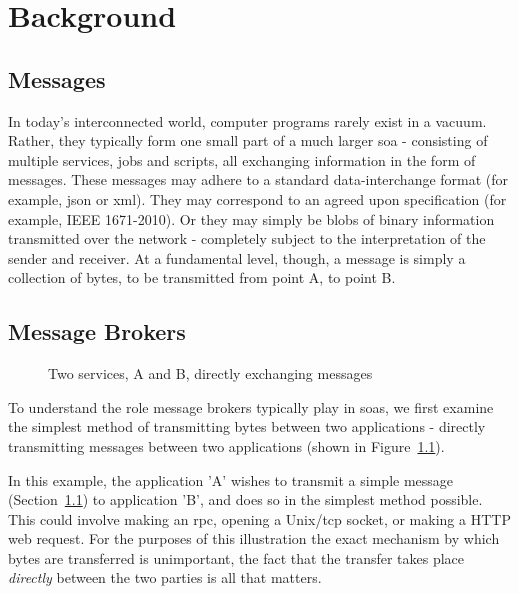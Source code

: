 \chapter{Background}
\label{chap:Background}

\section{Messages}
\label{sec:messages}

In today's interconnected world, computer programs rarely exist in a vacuum.
Rather, they typically form one small part of a much larger \gls{soa} -
consisting of multiple services, jobs and scripts, all exchanging information in
the form of messages. These messages may adhere to a standard data-interchange
format (for example, \gls{json} or \gls{xml}). They may correspond to an agreed
upon specification (for example, IEEE 1671-2010\cite{atml}).
Or they may simply be blobs of binary information transmitted over the network -
completely subject to the interpretation of the sender and receiver. At a
fundamental level, though, a message is simply a collection of bytes, to be
transmitted from point A, to point B.

\section{Message Brokers}
\label{sec:brokers}

\begin{figure}[ht]
  \centering
  
  \caption{Two services, A and B, directly exchanging messages}
  \label{fig:tikz:directMessaging}
\end{figure}

To understand the role message brokers typically play in \glspl{soa}, we first
examine the simplest method of transmitting bytes between two applications -
directly transmitting messages between two applications (shown in
Figure~\ref{fig:tikz:directMessaging}).

In this example, the application 'A' wishes to transmit a simple message
(Section~\ref{sec:messages}) to application 'B', and does so in the simplest
method possible. This could involve making an \gls{rpc}, opening a
Unix/\gls{tcp} socket, or making a HTTP web request. For the purposes of this
illustration the exact mechanism by which bytes are transferred is unimportant,
the fact that the transfer takes place \emph{directly} between the two parties
is all that matters.

